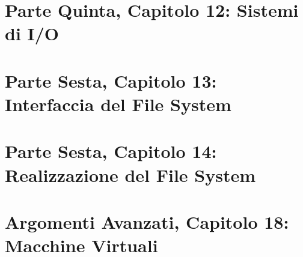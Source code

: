 \documentclass[12pt]{report}
\begin{document}
\chapter{Parte Quinta, Capitolo 12: Sistemi di I/O}


\chapter{Parte Sesta, Capitolo 13: Interfaccia del File System}


\chapter{Parte Sesta, Capitolo 14: Realizzazione del File System}


\chapter{Argomenti Avanzati, Capitolo 18: Macchine Virtuali}

\end{document}
